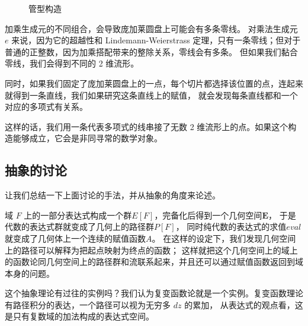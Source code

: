 \documentclass[a4paper,12pt]{article}
\numberwithin{problem}{section}
\numberwithin{definition}{section}
\numberwithin{lemma}{section}
\numberwithin{proposition}{section}
\numberwithin{theorem}{section}
\numberwithin{grammar}{section}
\numberwithin{program}{section}
\numberwithin{convention}{section}
\numberwithin{corollary}{section}
\begin{document}
\begin{figure}[ht]
    \centering
    \caption{管型构造}\label{fig:tube}
\end{figure}

加乘生成元的不同组合，会导致庞加莱圆盘上可能会有多条零线。
对乘法生成元 $e$ 来说，因为它的超越性和 Lindemann-Weierstrass 定理，只有一条零线；但对于普通的正整数，因为加乘搭配带来的整除关系，零线会有多条。
但如果我们黏合零线，我们会得到不同的 2 维流形。

同时，如果我们固定了庞加莱圆盘上的一点，每个切片都选择该位置的点，连起来就得到一条直线，我们如果研究这条直线上的赋值，
就会发现每条直线都和一个对应的多项式有关系。

这样的话，我们用一条代表多项式的线串接了无数 2 维流形上的点。如果这个构造能够成立，它会是非同寻常的数学对象。

\subsection{抽象的讨论}

让我们总结一下上面讨论的手法，并从抽象的角度来论述。

域 $F$ 上的一部分表达式构成一个群$E[F]$，完备化后得到一个几何空间$\mathbf{E}$，
于是代数的表达式群就变成了几何上的路径群$P[F]$， 同时纯代数的表达式的求值$eval$就变成了几何体上一个连续的赋值函数$A$。
在这样的设定下，我们发现几何空间上的路径可以解释为把起点映射为终点的函数；
这样就把这个几何空间上的域上的函数论同几何空间上的路径群和流联系起来，并且还可以通过赋值函数返回到域本身的问题。

这个抽象理论有过往的实例吗？我们认为复变函数论就是一个实例。复变函数理论有路径积分的表达，一个路径可以视为无穷多 $dz$ 的累加，
从表达式的观点看，这是只有复数域的加法构成的表达式空间。
\end{document}
